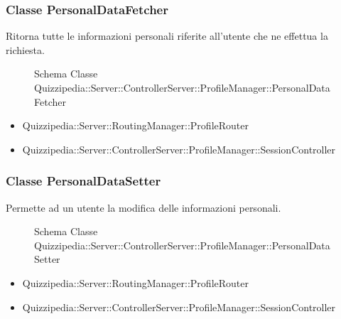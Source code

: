 \subsubsection{Classe PersonalDataFetcher}
Ritorna tutte le informazioni personali riferite all'utente che ne effettua la richiesta.
\begin{figure}[H]
\centering
\noindent{}
\caption[Schema Classe PersonalDataFetcher]{Schema Classe Quizzipedia::Server::ControllerServer::ProfileManager::PersonalDataFetcher}
\end{figure}
\begin{itemize}
\item Quizzipedia::Server::RoutingManager::ProfileRouter
\end{itemize}
\begin{itemize}
\item Quizzipedia::Server::ControllerServer::ProfileManager::SessionController
\end{itemize}
\subsubsection{Classe PersonalDataSetter}
Permette ad un utente la modifica delle informazioni personali.
\begin{figure}[H]
\centering
\noindent{}
\caption[Schema Classe PersonalDataSetter]{Schema Classe Quizzipedia::Server::ControllerServer::ProfileManager::PersonalDataSetter}
\end{figure}
\begin{itemize}
\item Quizzipedia::Server::RoutingManager::ProfileRouter
\end{itemize}
\begin{itemize}
\item Quizzipedia::Server::ControllerServer::ProfileManager::SessionController
\end{itemize}
